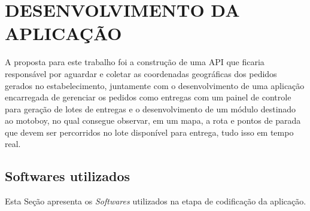 
\chapter{DESENVOLVIMENTO DA APLICAÇÃO}
A proposta para este trabalho foi a construção de uma API que ficaria responsável
por aguardar e coletar as coordenadas geográficas dos pedidos gerados no estabelecimento,
juntamente com o desenvolvimento de uma aplicação encarregada de gerenciar os pedidos como entregas
com um painel de controle para geração de lotes de entregas e o desenvolvimento de um módulo destinado ao motoboy, no qual consegue observar, em um mapa, a rota e pontos de parada que devem ser percorridos no lote disponível para entrega, tudo isso em tempo real.

\section{Softwares utilizados}
Esta Seção apresenta os \textit{Softwares} utilizados na etapa de codificação da aplicação.

